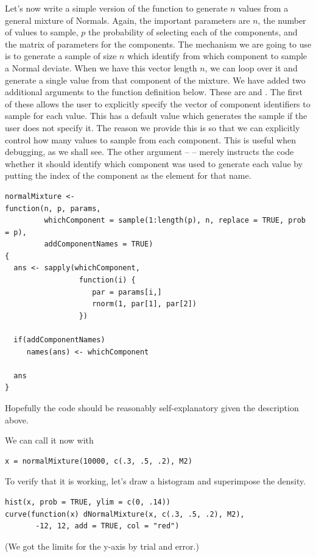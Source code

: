 Let's now write a simple version of the function to generate
$n$ values from a general mixture of Normals.
Again, the important parameters are $n$, the number of values to
sample, $p$ the probability of selecting each of the components, and
the matrix of parameters for the components.  The mechanism we are
going to use is to generate a sample of size $n$ which identify from
which component to sample a Normal deviate.  When we have this vector
length $n$, we can loop over it and generate a single value from that
component of the mixture.  We have added two additional arguments to the
function definition below.  These are  and
.  The first of these allows the user to
explicitly specify the vector of component identifiers to sample for
each value. This has a default value which generates the sample if the
user does not specify it.  The reason we provide this is so that we
can explicitly control how many values to sample from each component.
This is useful when debugging, as we shall see.  The other argument --
 -- merely instructs the code whether it
should identify which component was used to generate each value by
putting the index of the component as the element for that name.

{\footnotesize{
\begin{verbatim}
normalMixture <-
function(n, p, params,
         whichComponent = sample(1:length(p), n, replace = TRUE, prob = p),
         addComponentNames = TRUE)
{
  ans <- sapply(whichComponent,
                 function(i) {
                    par = params[i,]
                    rnorm(1, par[1], par[2])
                 })

  if(addComponentNames)
     names(ans) <- whichComponent

  ans
}
\end{verbatim}
}}
Hopefully the code should be reasonably self-explanatory given the
description above.

We can call it now with

\begin{verbatim}
x = normalMixture(10000, c(.3, .5, .2), M2)
\end{verbatim}

To verify that it is working, let's draw a histogram and superimpose
the  density.
\begin{verbatim}
hist(x, prob = TRUE, ylim = c(0, .14))
curve(function(x) dNormalMixture(x, c(.3, .5, .2), M2), 
       -12, 12, add = TRUE, col = "red")
\end{verbatim}
(We got the limits for the y-axis by trial and error.)

